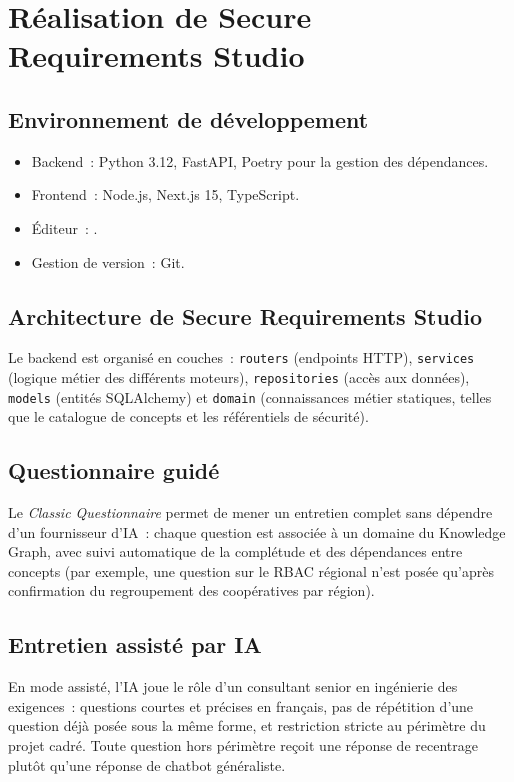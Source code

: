 \chapter{Réalisation de Secure Requirements Studio}

\section{Environnement de développement}
\begin{itemize}
    \item Backend~: Python 3.12, FastAPI, Poetry pour la gestion des dépendances.
    \item Frontend~: Node.js, Next.js 15, TypeScript.
    \item Éditeur~: .
    \item Gestion de version~: Git. 
\end{itemize}

\section{Architecture de Secure Requirements Studio}
Le backend est organisé en couches~: \texttt{routers} (endpoints HTTP), \texttt{services}
(logique métier des différents moteurs), \texttt{repositories} (accès aux données),
\texttt{models} (entités SQLAlchemy) et \texttt{domain} (connaissances métier statiques,
telles que le catalogue de concepts et les référentiels de sécurité).

\section{Questionnaire guidé}
Le \emph{Classic Questionnaire} permet de mener un entretien complet sans dépendre d'un
fournisseur d'IA~: chaque question est associée à un domaine du Knowledge Graph, avec
suivi automatique de la complétude et des dépendances entre concepts (par exemple, une
question sur le RBAC régional n'est posée qu'après confirmation du regroupement des
coopératives par région).

\section{Entretien assisté par IA}
En mode assisté, l'IA joue le rôle d'un consultant senior en ingénierie des exigences~:
questions courtes et précises en français, pas de répétition d'une question déjà posée
sous la même forme, et restriction stricte au périmètre du projet cadré. Toute question
hors périmètre reçoit une réponse de recentrage plutôt qu'une réponse de chatbot
généraliste.

